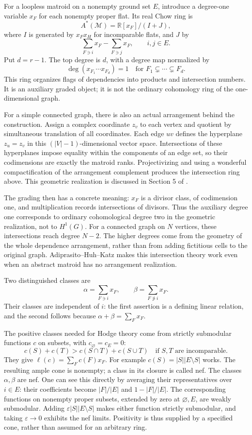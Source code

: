 \documentclass[11pt]{article}
\theoremstyle{definition}
\theoremstyle{remark}
\newcommand{\R}{\mathbb R}
\begin{document}
For a loopless matroid on a nonempty ground set $E$, introduce a degree-one variable $x_F$ for each nonempty proper flat. Its real Chow ring is
\[
 A^*(\mathcal M)=\R[x_F]/(I+J),
\]
where $I$ is generated by $x_Fx_H$ for incomparable flats, and $J$ by
\[
 \sum_{F\ni i}x_F-\sum_{F\ni j}x_F,
 \qquad i,j\in E.
\]
Put $d=r-1$. The top degree is $d$, with a degree map normalized by
\[
 \deg(x_{F_1}\cdots x_{F_d})=1
 \quad\text{for }F_1\subsetneq\cdots\subsetneq F_d.
\]
This ring organizes flags of dependencies into products and intersection numbers. It is an auxiliary graded object; it is not the ordinary cohomology ring of the one-dimensional graph.

For a simple connected graph, there is also an actual arrangement behind the construction. Assign a complex coordinate $z_v$ to each vertex and quotient by simultaneous translation of all coordinates. Each edge $uv$ defines the hyperplane $z_u=z_v$ in this $(|V|-1)$-dimensional vector space. Intersections of these hyperplanes impose equality within the components of an edge set, so their codimensions are exactly the matroid ranks. Projectivizing and using a wonderful compactification of the arrangement complement produces the intersection ring above. This geometric realization is discussed in Section 5 of \cite{gmhAHK2018}.

The grading then has a concrete meaning: $x_F$ is a divisor class, of codimension one, and multiplication records intersections of divisors. Thus the auxiliary degree one corresponds to ordinary cohomological degree two in the geometric realization, not to $H^1(G)$. For a connected graph on $N$ vertices, these intersections reach degree $N-2$. The higher degrees come from the geometry of the whole dependence arrangement, rather than from adding fictitious cells to the original graph. Adiprasito--Huh--Katz makes this intersection theory work even when an abstract matroid has no arrangement realization.

Two distinguished classes are
\[
 \alpha=\sum_{F\ni i}x_F,
 \qquad \beta=\sum_{F\not\ni i}x_F.
\]
Their classes are independent of $i$: the first assertion is a defining linear relation, and the second follows because $\alpha+\beta=\sum_Fx_F$.

The positive classes needed for Hodge theory come from strictly submodular functions $c$ on subsets, with $c_\varnothing=c_E=0$:
\[
 c(S)+c(T)>c(S\cap T)+c(S\cup T)
 \quad\text{if }S,T\text{ are incomparable}.
\]
They give $\ell(c)=\sum_Fc(F)x_F$. For example $c(S)=|S||E\setminus S|$ works. The resulting ample cone is nonempty; a class in its closure is called nef. The classes $\alpha,\beta$ are nef. One can see this directly by averaging their representatives over $i\in E$: their coefficients become $|F|/|E|$ and $1-|F|/|E|$. The corresponding functions on nonempty proper subsets, extended by zero at $\varnothing,E$, are weakly submodular. Adding $\varepsilon|S||E\setminus S|$ makes either function strictly submodular, and taking $\varepsilon\to0$ exhibits the nef limits. Positivity is thus supplied by a specified cone, rather than assumed for an arbitrary ring.
\end{document}
